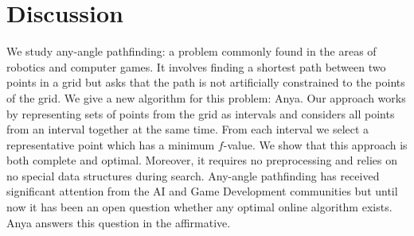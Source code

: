 \section{Discussion}
We study any-angle pathfinding: a problem commonly found in the areas of
robotics and computer games. It involves finding a shortest path between two
points in a grid but asks that the path is not artificially constrained to the
points of the grid.  We give a new algorithm for this problem: Anya.  Our
approach works by representing sets of points from the grid as intervals and
considers all points from an interval together at the same time. From each
interval we select a representative point which has a minimum $f$-value. We show
that this approach is both complete and optimal. Moreover, it requires no
preprocessing and relies on no special data structures during search.  Any-angle
pathfinding has received significant attention from the AI and Game Development
communities but until now it has been an open question whether any optimal
online algorithm exists. Anya answers this question in the affirmative.
